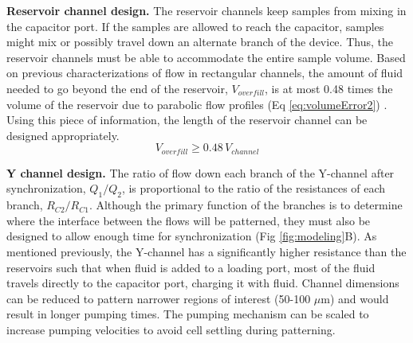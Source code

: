 {\bf Reservoir channel design.} The reservoir channels keep samples from mixing in the capacitor port. If the samples are allowed to reach the capacitor, samples might mix or possibly travel down an alternate branch of the device. Thus, the reservoir channels must be able to accommodate the entire sample volume. Based on previous characterizations of flow in rectangular channels, the amount of fluid needed to go beyond the end of the reservoir, $V_{overfill}$, is at most 0.48 times the volume of the reservoir due to parabolic flow profiles (Eq \ref{eq:volumeError2}) \cite{Warrick:2007lq}. Using this piece of information, the length of the reservoir channel can be designed appropriately. \\

\begin{equation}
V_{overfill} \ge 0.48 \, V_{channel}
\label{eq:volumeError2}
\end{equation}

{\bf Y channel design.} The ratio of flow down each branch of the Y-channel after synchronization, $Q_{1}/Q_{2}$, is proportional to the ratio of the resistances of each branch, $R_{C2}/R_{C1}$. Although the primary function of the branches is to determine where the interface between the flows will be patterned, they must also be designed to allow enough time for synchronization (Fig \ref{fig:modeling}B). As mentioned previously, the Y-channel has a significantly higher resistance than the reservoirs such that when fluid is added to a loading port, most of the fluid travels directly to the capacitor port, charging it with fluid. Channel dimensions can be reduced to pattern narrower regions of interest (50-100 $\mu$m) and would result in longer pumping times. The pumping mechanism can be scaled to increase pumping velocities to avoid cell settling during patterning.\\


